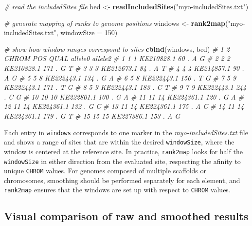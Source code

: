 \documentclass[
]{book}
\newenvironment{Shaded}{\begin{snugshade}}{\end{snugshade}}
\newcommand{\AttributeTok}[1]{\textcolor[rgb]{0.13,0.29,0.53}{#1}}
\newcommand{\CommentTok}[1]{\textcolor[rgb]{0.56,0.35,0.01}{\textit{#1}}}
\newcommand{\DecValTok}[1]{\textcolor[rgb]{0.00,0.00,0.81}{#1}}
\newcommand{\FunctionTok}[1]{\textcolor[rgb]{0.13,0.29,0.53}{\textbf{#1}}}
\newcommand{\NormalTok}[1]{#1}
\newcommand{\OtherTok}[1]{\textcolor[rgb]{0.56,0.35,0.01}{#1}}
\newcommand{\StringTok}[1]{\textcolor[rgb]{0.31,0.60,0.02}{#1}}
\begin{document}
\begin{Shaded}
\begin{Highlighting}[]
\CommentTok{\# read the includedSites file}
\NormalTok{bed }\OtherTok{\textless{}{-}} \FunctionTok{readIncludedSites}\NormalTok{(}\StringTok{"myo{-}includedSites.txt"}\NormalTok{)}

\CommentTok{\# generate mapping of ranks to genome positions}
\NormalTok{windows }\OtherTok{\textless{}{-}} \FunctionTok{rank2map}\NormalTok{(}\StringTok{"myo{-}includedSites.txt"}\NormalTok{, }\AttributeTok{windowSize =} \DecValTok{150}\NormalTok{)}

\CommentTok{\# show how window ranges correspond to sites}
\FunctionTok{cbind}\NormalTok{(windows, bed)}
\CommentTok{\#     1  2      CHROM POS QUAL allele0 allele2}
\CommentTok{\# 1   1  1 KE210828.1  60    .       A       G}
\CommentTok{\# 2   2  2 KE210828.1 171    .       G       T}
\CommentTok{\# 3   3  3 KE212673.1  84    .       A       T}
\CommentTok{\# 4   4  4 KE214857.1  90    .       A       G}
\CommentTok{\# 5   5  8 KE222443.1 134    .       G       A}
\CommentTok{\# 6   5  8 KE222443.1 156    .       T       G}
\CommentTok{\# 7   5  9 KE222443.1 171    .       T       G}
\CommentTok{\# 8   5  9 KE222443.1 183    .       C       T}
\CommentTok{\# 9   7  9 KE222443.1 244    .       C       G}
\CommentTok{\# 10 10 10 KE222801.1 100    .       G       A}
\CommentTok{\# 11 11 14 KE224361.1 120    .       G       A}
\CommentTok{\# 12 11 14 KE224361.1 132    .       G       C}
\CommentTok{\# 13 11 14 KE224361.1 175    .       A       C}
\CommentTok{\# 14 11 14 KE224361.1 179    .       G       T}
\CommentTok{\# 15 15 15 KE227386.1 153    .       A       G}
\end{Highlighting}
\end{Shaded}

Each entry in \texttt{windows} corresponds to one marker in the \emph{myo-includedSites.txt} file and shows a range of sites that are within the desired \texttt{windowSize}, where the window is centered at the reference site. In practice, \texttt{rank2map} looks for half the \texttt{windowSize} in either direction from the evaluated site, respecting the afinity to unique \texttt{CHROM} values. For genomes composed of multiple scaffolds or chromosomes, smoothing should be performed separately for each element, and \texttt{rank2map} ensures that the windows are set up with respect to \texttt{CHROM} values.

\subsection{Visual comparison of raw and smoothed results}\label{visual-comparison-of-raw-and-smoothed-results}
\end{document}
